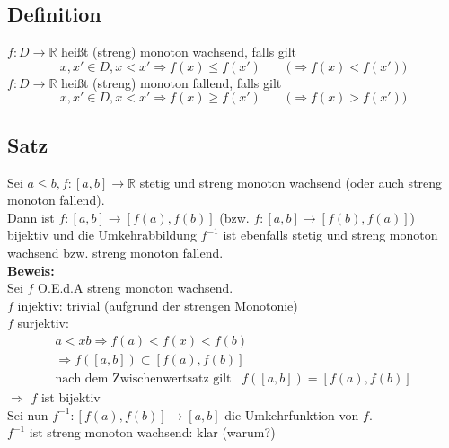 
\subsection{Definition} %
\label{sub:definition}
$f: D \to \mathds{R}$ heißt (streng) monoton wachsend, falls gilt
\[
	x,x' \in D , x < x' \Rightarrow f(x) \le f(x') \qquad \big(\Rightarrow f(x) < f(x')\big)
\]
$f: D \to \mathds{R}$ heißt (streng) monoton fallend, falls gilt
\[
	x,x' \in D , x < x' \Rightarrow f(x) \ge f(x') \qquad \big(\Rightarrow f(x) > f(x')\big)
\]

\subsection{Satz} %
\label{sub:satz}
Sei $a \le b , f: [a,b] \to \mathds{R}$ stetig und streng monoton wachsend (oder auch streng monoton fallend).
\vspace{10pt} \\
Dann ist $f: [a,b] \to \left[f(a), f(b)\right]$ (bzw. $f: [a,b] \to \left[f(b), f(a)\right]$) bijektiv und die Umkehrabbildung $f ^{-1}$ ist ebenfalls stetig und streng monoton wachsend bzw. streng monoton fallend.
\vspace{\baselineskip} \\
\underline{\textbf{Beweis:}} \\
Sei $f$ O.E.d.A streng monoton wachsend. \\
$f$ injektiv: trivial (aufgrund der strengen Monotonie)
\vspace{10pt} \\
$f$ surjektiv: \\
\begin{gather*}
	a < x b \Rightarrow f(a) < f(x) < f(b) \\
	\Rightarrow f \left([a,b]\right) \subset \left[ f(a), f(b)\right] \\
	\text{nach dem Zwischenwertsatz gilt } \enspace f \left( [a,b]\right) = \left[f(a), f(b)\right]
\end{gather*}
$\Rightarrow $ $f$ ist bijektiv
\vspace{\baselineskip} \\
Sei nun $f ^{-1} : [f(a), f(b)] \to [a,b]$ die Umkehrfunktion von $f$. 
\vspace{10pt} \\
$f ^{-1}$ ist streng monoton wachsend: klar (warum?)
\vspace{10pt} \\

